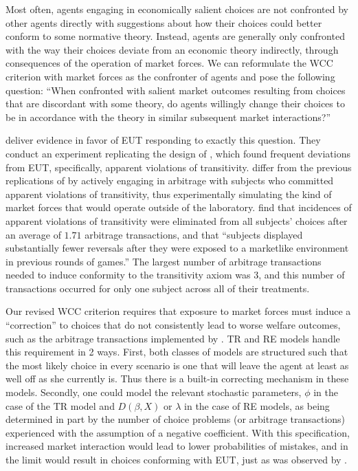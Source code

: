 \documentclass[../main.tex]{subfiles}
\begin{document}
Most often, agents engaging in economically salient choices are not confronted by other agents directly with suggestions about how their choices could better conform to some normative theory.
Instead, agents are generally only confronted with the way their choices deviate from an economic theory indirectly, through consequences of the operation of market forces.
We can reformulate the WCC criterion with market forces as the confronter of agents and pose the following question:
\enquote{When confronted with salient market outcomes resulting from choices that are discordant with some theory, do agents willingly change their choices to be in accordance with the theory in similar subsequent market interactions?}

\textcite{Chu1990} deliver evidence in favor of EUT responding to exactly this question.
They conduct an experiment replicating the design of \textcite{Grether1979}, which found frequent deviations from EUT, specifically, apparent violations of transitivity.
\textcite{Chu1990} differ from the previous replications of \textcite{Grether1979} by actively engaging in arbitrage with subjects who committed apparent violations of transitivity, thus experimentally simulating the kind of market forces that would operate outside of the laboratory.
\textcite[910]{Chu1990} find that incidences of apparent violations of transitivity were eliminated from all subjects' choices after an average of $1.71$ arbitrage transactions, and that \enquote{subjects displayed substantially fewer reversals  after they were exposed to a marketlike environment in previous rounds of games.}
The largest number of arbitrage transactions needed to induce conformity to the transitivity axiom was $3$, and this number of transactions occurred for only one subject across all of their treatments.

Our revised WCC criterion requires that exposure to market forces must induce a \enquote{correction} to choices that do not consistently lead to worse welfare outcomes, such as the arbitrage transactions implemented by \textcite{Chu1990}.
TR and RE models handle this requirement in 2 ways.
First, both classes of models are structured such that the most likely choice in every scenario is one that will leave the agent at least as well off as she currently is.
Thus there is a built-in correcting mechanism in these models.
Secondly, one could model the relevant stochastic parameters, $\phi$ in the case of the TR model and $D(\beta,X)$ or $\lambda$ in the case of RE models, as being determined in part by the number of choice problems (or arbitrage transactions) experienced with the assumption of a negative coefficient.
With this specification, increased market interaction would lead to lower probabilities of mistakes, and in the limit would result in choices conforming with EUT, just as was observed by \textcite{Chu1990}.
\end{document}
